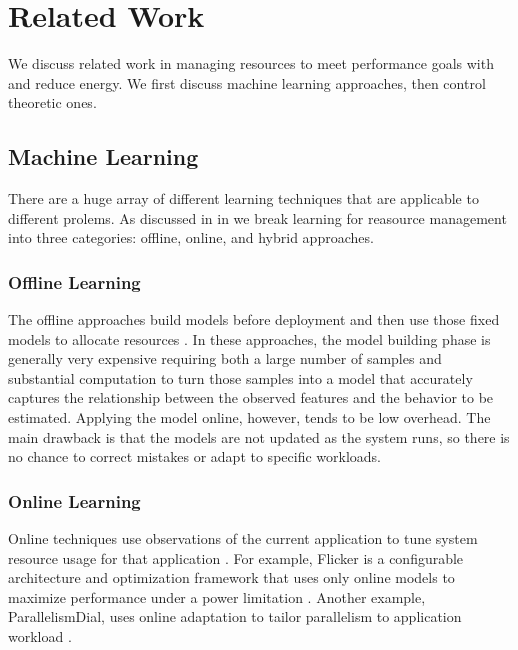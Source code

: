 \section{Related Work}

We discuss related work in managing resources to meet performance
goals with and reduce energy.  We first discuss machine learning
approaches, then control theoretic ones.  

\subsection{Machine Learning}
There are a huge array of different learning techniques that are
applicable to different prolems.  As discussed in in 
we break learning for reasource management into three categories:
offline, online, and hybrid approaches.  

\subsubsection{Offline Learning}
The offline approaches build models before deployment and then use
those fixed models to allocate resources
\cite{Yi2003,LeeBrooks2006,CPR,ChenJohn2011,petabricksStatic}.  In
these approaches, the model building phase is generally very expensive
requiring both a large number of samples and substantial computation
to turn those samples into a model that accurately captures the
relationship between the observed features and the behavior to be
estimated.  Applying the model online, however, tends to be low
overhead.  The main drawback is that the models are not updated as the
system runs, so there is no chance to correct mistakes or adapt to
specific workloads.


\subsubsection{Online Learning}
Online techniques use observations of the current application to tune
system resource usage for that application
\cite{Li2006,Flicker,ParallelismDial,Ponamarev,petabricksDynamic,LeeBrooks}.
For example, Flicker is a configurable architecture and optimization
framework that uses only online models to maximize performance under a
power limitation \cite{Flicker}.  Another example, ParallelismDial,
uses online adaptation to tailor parallelism to application workload
\cite{ParallelismDial}.



